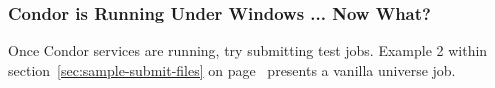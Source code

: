 
\subsubsection{\label{nt-running-now-what}
Condor is Running Under Windows ... Now What?}

Once Condor services are running, try submitting test jobs.
Example 2 within section~\ref{sec:sample-submit-files} 
on page~\pageref{sec:sample-submit-files} presents a vanilla
universe job.
